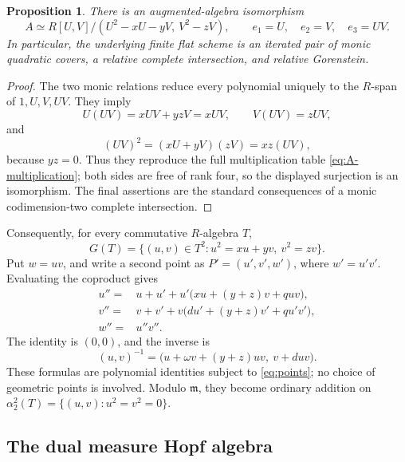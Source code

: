 \documentclass[11pt]{article}
\newtheorem{proposition}[theorem]{Proposition}
\theoremstyle{remark}
\newcommand{\m}{\mathfrak m}
\begin{document}
\begin{proposition}\label{prop:complete-intersection}
There is an augmented-algebra isomorphism
\begin{equation}\label{eq:CI-presentation}
 A\simeq R[U,V]/(U^2-xU-yV,\ V^2-zV),
 \qquad e_1=U,\quad e_2=V,\quad e_3=UV.
\end{equation}
In particular, the underlying finite flat scheme is an iterated pair of
monic quadratic covers, a relative complete intersection, and relative
Gorenstein.
\end{proposition}

\begin{proof}
The two monic relations reduce every polynomial uniquely to the
\(R\)-span of \(1,U,V,UV\).  They imply
\[
 U(UV)=xUV+yzV=xUV,\qquad V(UV)=zUV,
\]
and
\[
 (UV)^2=(xU+yV)(zV)=xz(UV),
\]
because \(yz=0\).  Thus they reproduce the full multiplication table
\eqref{eq:A-multiplication}; both sides are free of rank four, so the
displayed surjection is an isomorphism.  The final assertions are the
standard consequences of a monic codimension-two complete intersection.
\end{proof}

Consequently, for every commutative \(R\)-algebra \(T\),
\begin{equation}\label{eq:points}
 G(T)=\{(u,v)\in T^2:u^2=xu+yv,\ v^2=zv\}.
\end{equation}
Put \(w=uv\), and write a second point as
\(P'=(u',v',w')\), where \(w'=u'v'\).  Evaluating the coproduct gives
\begin{equation}\label{eq:point-law}
\begin{aligned}
 u''={}&u+u'+u'\bigl(xu+(y+z)v+q uv\bigr),\\
 v''={}&v+v'+v\bigl(du'+(y+z)v'+q u'v'\bigr),\\
 w''={}&u''v''.
\end{aligned}
\end{equation}
The identity is \((0,0)\), and the inverse is
\begin{equation}\label{eq:point-inverse}
 (u,v)^{-1}
 =\bigl(u+\omega v+(y+z)uv,\ v+duv\bigr).
\end{equation}
These formulas are polynomial identities subject to
\eqref{eq:points}; no choice of geometric points is involved.  Modulo
\(\m\), they become ordinary addition on
\(\alpha_2^2(T)=\{(u,v):u^2=v^2=0\}\).

\subsection{The dual measure Hopf algebra}
\end{document}
